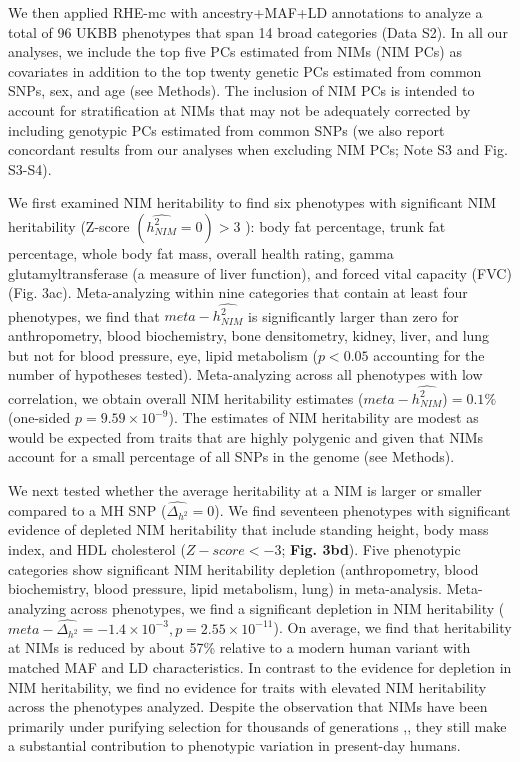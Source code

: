 We then applied RHE-mc with ancestry+MAF+LD annotations to analyze a total of 96 UKBB phenotypes that span 14 broad categories (Data S2). In all our analyses, we include the top five PCs estimated from NIMs (NIM PCs) as covariates in addition to the top twenty genetic PCs estimated from common SNPs, sex, and age (see Methods). The inclusion of NIM PCs is intended to account for stratification at NIMs that may not be adequately corrected by including genotypic PCs estimated from common SNPs (we also report concordant results from our analyses when excluding NIM PCs; Note S3 and Fig. S3-S4).

We first examined NIM heritability to find six phenotypes with significant NIM heritability (Z-score $(\hat{h^2_{NIM}}=0)>3$ ): body fat percentage, trunk fat percentage, whole body fat mass, overall health rating, gamma glutamyltransferase (a measure of liver function), and forced vital capacity (FVC) (Fig. 3ac). Meta-analyzing within nine categories that contain at least four phenotypes, we find that $meta-\hat{h^2_{NIM}}$ is significantly larger than zero for anthropometry, blood biochemistry, bone densitometry, kidney, liver, and lung but not for blood pressure, eye, lipid metabolism ($p < 0.05$ accounting for the number of hypotheses tested).  Meta-analyzing across all phenotypes with low correlation, we obtain overall NIM heritability estimates ($meta -\hat{h^2_{NIM}}$)$=0.1\%$ (one-sided $p=9.59\times10^{-9}$). The estimates of NIM heritability are modest as would be expected from traits that are highly polygenic and given that NIMs account for a small percentage of all SNPs in the genome (see Methods). 

We next tested whether the average heritability at a NIM is larger or smaller compared to a MH SNP ($\hat{\Delta_{h^2}}=0$). We find seventeen phenotypes with significant evidence of depleted NIM heritability that include standing height, body mass index, and HDL cholesterol ($Z-score < -3$; \textbf{Fig. 3bd}). Five phenotypic categories show significant NIM heritability depletion (anthropometry, blood biochemistry, blood pressure, lipid metabolism, lung) in meta-analysis. Meta-analyzing across phenotypes, we find a significant depletion in NIM heritability ($meta-\hat{\Delta_{h^2}} = -1.4\times10^{-3}, p= 2.55\times 10^{-11}$). On average, we find that heritability at NIMs is reduced by about 57\% relative to a modern human variant with matched MAF and LD characteristics. In contrast to the evidence for depletion in NIM heritability, we find no evidence for traits with elevated NIM heritability across the phenotypes analyzed. Despite the observation that NIMs have been primarily under purifying selection for thousands of generations \cite{harris2016genetic},\cite{petr2019limits}, they still make a substantial contribution to phenotypic variation in present-day humans. 
  
